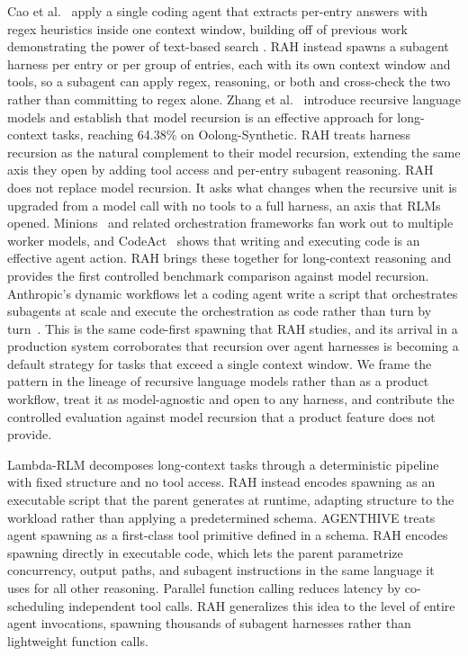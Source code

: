\documentclass[sigconf,nonacm]{acmart}
\begin{document}
Cao et al.~\cite{cao2026oolong} apply a single coding agent that extracts per-entry answers with regex heuristics inside one context window, building off of previous work demonstrating the power of text-based search \cite{sen2026chronos, sen2026grep}. RAH instead spawns a subagent harness per entry or per group of entries, each with its own context window and tools, so a subagent can apply regex, reasoning, or both and cross-check the two rather than committing to regex alone.
Zhang et al.~\cite{zhang2024rlm} introduce recursive language models and establish that model recursion is an effective approach for long-context tasks, reaching 64.38\% on Oolong-Synthetic. RAH treats harness recursion as the natural complement to their model recursion, extending the same axis they open by adding tool access and per-entry subagent reasoning. RAH does not replace model recursion. It asks what changes when the recursive unit is upgraded from a model call with no tools to a full harness, an axis that RLMs opened.
Minions~\cite{narayan2025minions} and related orchestration frameworks fan work out to multiple worker models, and CodeAct~\cite{wang2024codeact} shows that writing and executing code is an effective agent action. RAH brings these together for long-context reasoning and provides the first controlled benchmark comparison against model recursion.
Anthropic's dynamic workflows let a coding agent write a script that orchestrates subagents at scale and execute the orchestration as code rather than turn by turn~\cite{anthropic2026workflows}. This is the same code-first spawning that RAH studies, and its arrival in a production system corroborates that recursion over agent harnesses is becoming a default strategy for tasks that exceed a single context window. We frame the pattern in the lineage of recursive language models rather than as a product workflow, treat it as model-agnostic and open to any harness, and contribute the controlled evaluation against model recursion that a product feature does not provide.

Lambda-RLM \cite{lambdarlm2026} decomposes long-context tasks through a deterministic pipeline with fixed structure and no tool access. RAH instead encodes spawning as an executable script that the parent generates at runtime, adapting structure to the workload rather than applying a predetermined schema.
AGENTHIVE \cite{agenthive2026} treats agent spawning as a first-class tool primitive defined in a schema. RAH encodes spawning directly in executable code, which lets the parent parametrize concurrency, output paths, and subagent instructions in the same language it uses for all other reasoning.
Parallel function calling \cite{kim2024llmcompiler} reduces latency by co-scheduling independent tool calls. RAH generalizes this idea to the level of entire agent invocations, spawning thousands of subagent harnesses rather than lightweight function calls.
\end{document}
